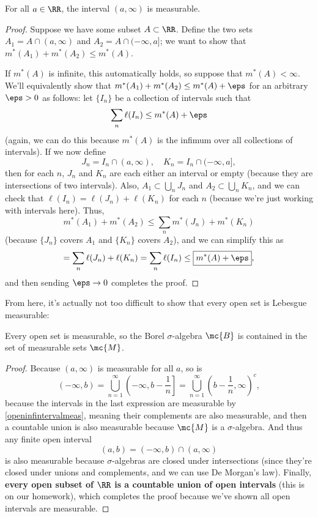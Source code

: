 \begin{proposition}\label{openinfintervalmeas}
For all $a \in \RR$, the interval $(a, \infty)$ is measurable.
\end{proposition}
\begin{proof}
Suppose we have some subset $A \subset \RR$. Define the two sets $A_1 = A \cap (a, \infty)$ and $A_2 = A \cap (-\infty, a]$; we want to show that $m^\ast(A_1) + m^\ast(A_2) \le m^\ast(A)$. 

If $m^\ast(A)$ is infinite, this automatically holds, so suppose that $m^\ast(A) < \infty$. We'll equivalently show that $m^\ast(A_1) + m^\ast(A_2) \le m^\ast(A) + \eps$ for an arbitrary $\eps > 0$ as follows: let $\{I_n\}$ be a collection of intervals such that 
\[
    \sum_n \ell(I_n) \le m^\ast(A) + \eps
\]
(again, we can do this because $m^\ast(A)$ is the infimum over all collections of intervals). If we now define 
\[
    J_n = I_n \cap (a, \infty), \quad K_n = I_n \cap (-\infty, a],
\]
then for each $n$, $J_n$ and $K_n$ are each either an interval or empty (because they are intersections of two intervals). Also, $A_1 \subset \bigcup_n J_n$ and $A_2 \subset \bigcup_n K_n$, and we can check that $\ell(I_n) = \ell(J_n) + \ell(K_n)$ for each $n$ (because we're just working with intervals here). Thus, 
\[
    \boxed{m^\ast(A_1) + m^\ast(A_2)} \le \sum_n m^\ast(J_n) + m^\ast(K_n)
\]
(because $\{J_n\}$ covers $A_1$ and $\{K_n\}$ covers $A_2$), and we can simplify this as 
\[
    = \sum_n \ell(J_n) + \ell(K_n) = \sum_n \ell(I_n) \le \boxed{m^\ast(A) + \eps},
\]
and then sending $\eps \to 0$ completes the proof.
\end{proof}

From here, it's actually not too difficult to show that every open set is Lebesgue measurable:

\begin{theorem}
Every open set is measurable, so the Borel $\sigma$-algebra $\mc{B}$ is contained in the set of measurable sets $\mc{M}$.
\end{theorem}
\begin{proof}
Because $(a, \infty)$ is measurable for all $a$, so is 
\[
    (-\infty, b) = \bigcup_{n=1}^{\infty} \left(-\infty, b - \frac{1}{n}\right] = \bigcup_{n=1}^{\infty} \left(b - \frac{1}{n}, \infty\right)^c,
\]
because the intervals in the last expression are measurable by \cref{openinfintervalmeas}, meaning their complements are also measurable, and then a countable union is also measurable because $\mc{M}$ is a $\sigma$-algebra. And thus any finite open interval 
\[
    (a, b) = (-\infty, b) \cap (a, \infty)
\]
is also measurable because $\sigma$-algebras are closed under intersections (since they're closed under unions and complements, and we can use De Morgan's law). Finally, \textbf{every open subset of $\RR$ is a countable union of open intervals} (this is on our homework), which completes the proof because we've shown all open intervals are measurable. 
\end{proof}

